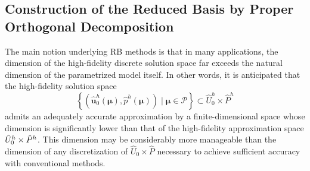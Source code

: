 \documentclass[onecolumn, twoside, a4paper, 11pt]{article}
\begin{document}
\subsection{Construction of the Reduced Basis by Proper Orthogonal Decomposition}
The main notion underlying RB methods is that in many applications, the dimension of the
high-fidelity discrete solution space  far exceeds the natural dimension of the parametrized
model itself. In other words, it is anticipated that the high-fidelity solution space
%
\begin{equation}
  \left\{ (\hat{\bm u}^h_0(\bm \mu), \hat{p}^h(\bm \mu)) \;|\; \bm \mu \in \mathcal{P} \right\}
  \subset \hat{U}_0^h \times \hat{P}^h
  \label{eqn:nspace}
\end{equation}
%
admits an adequately accurate approximation by a finite-dimensional space whose dimension is
significantly lower than that of the high-fidelity approximation space $\smash[t]{\hat{U}_0^h \times \hat{P}^h}$.
This dimension may be
considerably more manageable than the dimension of any discretization of $\hat{U}_0 \times \hat{P}$
necessary to achieve sufficient accuracy with conventional methods.
\end{document}
